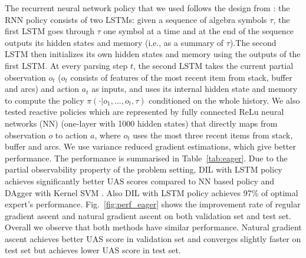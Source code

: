 \documentclass{article}
\begin{document}
The recurrent neural network policy that we used follows the design from \cite{sutskever2014sequence}: the RNN policy consists of two LSTMs: given a sequence  of algebra symbols $\tau$, the first LSTM goes through $\tau$ one symbol at a time and at the end of the sequence outputs its hidden states and memory (i.e., as a summary of $\tau$).The second LSTM then initializes its own hidden states and memory using the outputs of the first LSTM. At every parsing step $t$, the second LSTM takes the current partial observation $o_t$ ($o_t$ consists of features of the most recent item from stack, buffer and arcs) and action $a_t$ as inputs, and uses its internal hidden state and memory to compute the policy $\pi(\cdot|o_1,...,o_t,\tau)$ conditioned on the whole history. We also tested reactive policies which are represented by fully connected ReLu neural networks (NN) (one-layer with 1000 hidden states) that directly maps from observation $o$ to action $a$, where $o_t$ uses the most three recent items from stack, buffer and arcs. We use variance reduced gradient estimations, which give better performance. The performance is summarised in Table~\ref{tab:eager}. Due to the partial observability property of the problem setting, DIL with LSTM policy achieves significantly better UAS scores compared to NN based policy and DAgger with Kernel SVM \cite{duyckpredicting}. Also DIL with LSTM policy achieves 97$\%$ of optimal expert's performance. Fig.~\ref{fig:perf_eager} shows the improvement rate of regular gradient ascent and natural gradient ascent on both validation set and test set. Overall we observe that both methods have similar performance. Natural gradient ascent achieves better UAS score in validation set and converges slightly faster on test set but achieves lower UAS score in test set. 


\end{document}
